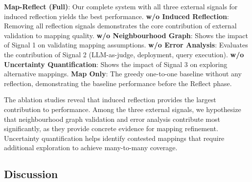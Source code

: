 \documentclass[sigconf, nonacm]{acmart}
\newcommand{\deleted}[1]{\textcolor{red}{#1}}
\begin{document}

\textbf{Map-Reflect (Full)}: Our complete system with all three external signals for induced reflection yields the best performance. \textbf{w/o Induced Reflection}: Removing all reflection signals demonstrates the core contribution of external validation to mapping quality. \textbf{w/o Neighbourhood Graph}: Shows the impact of Signal 1 on validating mapping assumptions. \textbf{w/o Error Analysis}: Evaluates the contribution of Signal 2 (LLM-as-judge, deployment, query execution). \textbf{w/o Uncertainty Quantification}: Shows the impact of Signal 3 on exploring alternative mappings. \textbf{Map Only}: The greedy one-to-one baseline without any reflection, demonstrating the baseline performance before the Reflect phase.


The ablation studies reveal that induced reflection provides the largest contribution to performance. Among the three external signals, we hypothesize that neighbourhood graph validation and error analysis contribute most significantly, as they provide concrete evidence for mapping refinement. Uncertainty quantification helps identify contested mappings that require additional exploration to achieve many-to-many coverage.


\subsection{Discussion}
\end{document}
